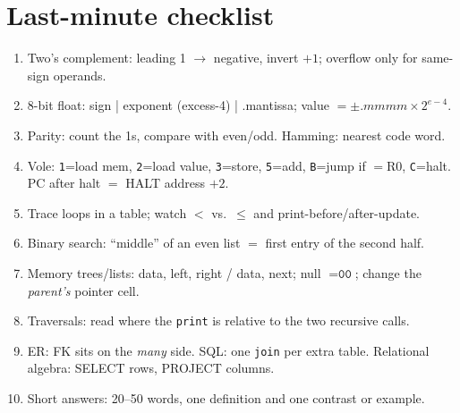 \documentclass{fkt-notes}
\newcommand{\hx}[1]{\texttt{#1}}
\begin{document}
\newpage
\section{Last-minute checklist}
\begin{enumerate}[nosep]
  \item Two's complement: leading 1 $\to$ negative, invert $+1$; overflow only for same-sign operands.
  \item 8-bit float: sign | exponent (excess-4) | .mantissa; value $=\pm.mmmm\times2^{e-4}$.
  \item Parity: count the 1s, compare with even/odd. Hamming: nearest code word.
  \item Vole: \hx{1}=load mem, \hx{2}=load value, \hx{3}=store, \hx{5}=add, \hx{B}=jump if $=$R0, \hx{C}=halt. PC after halt $=$ HALT address $+2$.
  \item Trace loops in a table; watch $<$ vs.\ $\le$ and print-before/after-update.
  \item Binary search: ``middle'' of an even list $=$ first entry of the second half.
  \item Memory trees/lists: data, left, right / data, next; null $=\hx{00}$; change the \emph{parent's} pointer cell.
  \item Traversals: read where the \texttt{print} is relative to the two recursive calls.
  \item ER: FK sits on the \emph{many} side. SQL: one \texttt{join} per extra table. Relational algebra: SELECT rows, PROJECT columns.
  \item Short answers: 20--50 words, one definition and one contrast or example.
\end{enumerate}
\end{document}
